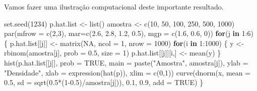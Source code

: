 \documentclass[
  10pt,
  a4paper]{book}
\newenvironment{Shaded}{\begin{snugshade}}{\end{snugshade}}
\newcommand{\AttributeTok}[1]{\textcolor[rgb]{0.77,0.63,0.00}{#1}}
\newcommand{\ConstantTok}[1]{\textcolor[rgb]{0.00,0.00,0.00}{#1}}
\newcommand{\ControlFlowTok}[1]{\textcolor[rgb]{0.13,0.29,0.53}{\textbf{#1}}}
\newcommand{\DecValTok}[1]{\textcolor[rgb]{0.00,0.00,0.81}{#1}}
\newcommand{\FloatTok}[1]{\textcolor[rgb]{0.00,0.00,0.81}{#1}}
\newcommand{\FunctionTok}[1]{\textcolor[rgb]{0.00,0.00,0.00}{#1}}
\newcommand{\NormalTok}[1]{#1}
\newcommand{\OtherTok}[1]{\textcolor[rgb]{0.56,0.35,0.01}{#1}}
\newcommand{\SpecialCharTok}[1]{\textcolor[rgb]{0.00,0.00,0.00}{#1}}
\newcommand{\StringTok}[1]{\textcolor[rgb]{0.31,0.60,0.02}{#1}}
\begin{document}
Vamos fazer uma ilustração computacional deste importante resultado.

\begin{Shaded}
\begin{Highlighting}[]
\FunctionTok{set.seed}\NormalTok{(}\DecValTok{1234}\NormalTok{)}
\NormalTok{p.hat.list }\OtherTok{\textless{}{-}} \FunctionTok{list}\NormalTok{()}
\NormalTok{amostra }\OtherTok{\textless{}{-}} \FunctionTok{c}\NormalTok{(}\DecValTok{10}\NormalTok{, }\DecValTok{50}\NormalTok{, }\DecValTok{100}\NormalTok{, }\DecValTok{250}\NormalTok{, }\DecValTok{500}\NormalTok{, }\DecValTok{1000}\NormalTok{)}
\FunctionTok{par}\NormalTok{(}\AttributeTok{mfrow =} \FunctionTok{c}\NormalTok{(}\DecValTok{2}\NormalTok{,}\DecValTok{3}\NormalTok{), }\AttributeTok{mar=}\FunctionTok{c}\NormalTok{(}\FloatTok{2.6}\NormalTok{, }\FloatTok{2.8}\NormalTok{, }\FloatTok{1.2}\NormalTok{, }\FloatTok{0.5}\NormalTok{), }\AttributeTok{mgp =} \FunctionTok{c}\NormalTok{(}\FloatTok{1.6}\NormalTok{, }\FloatTok{0.6}\NormalTok{, }\DecValTok{0}\NormalTok{))}
\ControlFlowTok{for}\NormalTok{(j }\ControlFlowTok{in} \DecValTok{1}\SpecialCharTok{:}\DecValTok{6}\NormalTok{) \{}
\NormalTok{  p.hat.list[[j]] }\OtherTok{\textless{}{-}} \FunctionTok{matrix}\NormalTok{(}\ConstantTok{NA}\NormalTok{, }\AttributeTok{ncol =} \DecValTok{1}\NormalTok{, }\AttributeTok{nrow =} \DecValTok{1000}\NormalTok{)}
  \ControlFlowTok{for}\NormalTok{(i }\ControlFlowTok{in} \DecValTok{1}\SpecialCharTok{:}\DecValTok{1000}\NormalTok{) \{}
\NormalTok{  y }\OtherTok{\textless{}{-}} \FunctionTok{rbinom}\NormalTok{(amostra[j], }\AttributeTok{prob =} \FloatTok{0.5}\NormalTok{, }\AttributeTok{size =} \DecValTok{1}\NormalTok{)}
\NormalTok{  p.hat.list[[j]][i,] }\OtherTok{\textless{}{-}} \FunctionTok{mean}\NormalTok{(y)}
\NormalTok{  \}}
  \FunctionTok{hist}\NormalTok{(p.hat.list[[j]], }\AttributeTok{prob =} \ConstantTok{TRUE}\NormalTok{, }\AttributeTok{main =} \FunctionTok{paste}\NormalTok{(}\StringTok{"Amostra"}\NormalTok{, amostra[j]), }
       \AttributeTok{ylab =} \StringTok{"Densidade"}\NormalTok{, }\AttributeTok{xlab =} \FunctionTok{expression}\NormalTok{(}\FunctionTok{hat}\NormalTok{(p)), }\AttributeTok{xlim =} \FunctionTok{c}\NormalTok{(}\DecValTok{0}\NormalTok{,}\DecValTok{1}\NormalTok{))}
  \FunctionTok{curve}\NormalTok{(}\FunctionTok{dnorm}\NormalTok{(x, }\AttributeTok{mean =} \FloatTok{0.5}\NormalTok{, }\AttributeTok{sd =} \FunctionTok{sqrt}\NormalTok{(}\FloatTok{0.5}\SpecialCharTok{*}\NormalTok{(}\DecValTok{1}\FloatTok{{-}0.5}\NormalTok{)}\SpecialCharTok{/}\NormalTok{amostra[j])), }\FloatTok{0.1}\NormalTok{, }\FloatTok{0.9}\NormalTok{, }\AttributeTok{add =} \ConstantTok{TRUE}\NormalTok{)}
\NormalTok{\}}
\end{Highlighting}
\end{Shaded}
\end{document}
